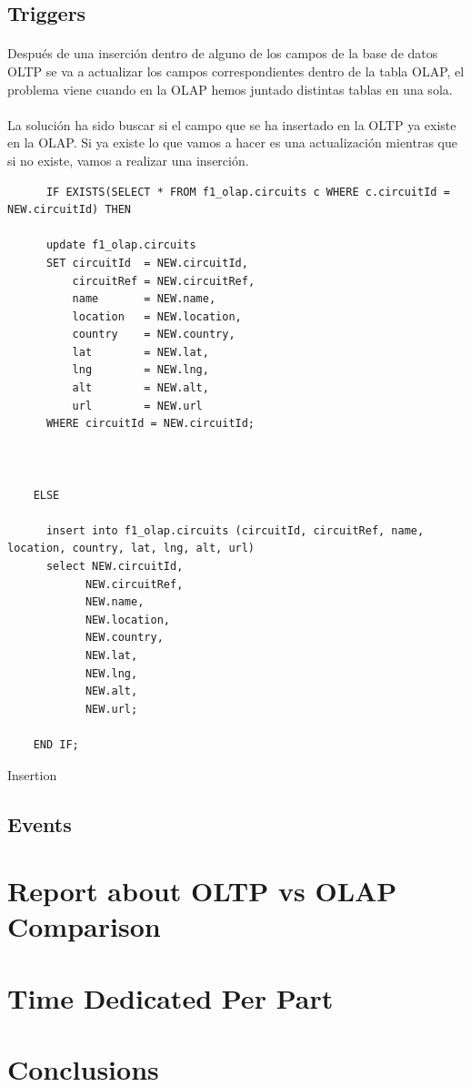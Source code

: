 \documentclass[%
,twoside
]{article}
\begin{document}
\subsection{Triggers}
\paragraph{}
Después de una inserción dentro de alguno de los campos de la base de datos OLTP se va a actualizar los campos correspondientes dentro de la tabla OLAP, el problema viene cuando en la OLAP hemos juntado distintas tablas en una sola.
\paragraph{}
La solución ha sido buscar si el campo que se ha insertado en la OLTP ya existe en la OLAP. Si ya existe lo que vamos a hacer es una actualización mientras que si no existe, vamos a realizar una inserción.

\begin{listing}[H]
  \begin{verbatim}
      IF EXISTS(SELECT * FROM f1_olap.circuits c WHERE c.circuitId = NEW.circuitId) THEN

      update f1_olap.circuits
      SET circuitId  = NEW.circuitId,
          circuitRef = NEW.circuitRef,
          name       = NEW.name,
          location   = NEW.location,
          country    = NEW.country,
          lat        = NEW.lat,
          lng        = NEW.lng,
          alt        = NEW.alt,
          url        = NEW.url
      WHERE circuitId = NEW.circuitId;



    ELSE

      insert into f1_olap.circuits (circuitId, circuitRef, name, location, country, lat, lng, alt, url)
      select NEW.circuitId,
            NEW.circuitRef,
            NEW.name,
            NEW.location,
            NEW.country,
            NEW.lat,
            NEW.lng,
            NEW.alt,
            NEW.url;

    END IF;

  \end{verbatim}
  \caption{Insertion}
  \label{lst:insert}
\end{listing}

\subsection{Events}

\section{Report about OLTP vs OLAP Comparison}
\section{Time Dedicated Per Part}
\section{Conclusions}


  
  \nocite{*}
\end{document}
